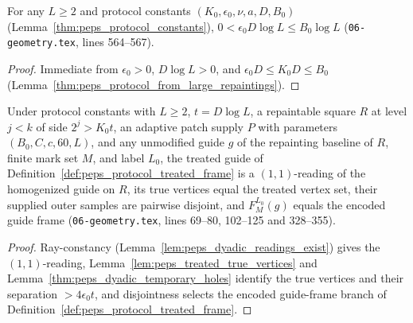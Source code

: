 \begin{lemma}
    \label{thm:peps_treated_radius_bounds}
    \leanok
    For any $L\ge2$ and protocol constants $(K_0,\epsilon_0,\nu,a,D,B_0)$ (Lemma~\ref{thm:peps_protocol_constants}), $0<\epsilon_0D\log L\le B_0\log L$ (\texttt{06-geometry.tex}, lines 564--567).
\end{lemma}

\begin{proof}\leanok
    Immediate from $\epsilon_0>0$, $D\log L>0$, and $\epsilon_0D\le K_0D\le B_0$ (Lemma~\ref{thm:peps_protocol_from_large_repaintings}).
\end{proof}

\begin{lemma}
    \label{thm:peps_treated_frame_spec}
    \leanok
    Under protocol constants with $L\ge2$, $t=D\log L$, a repaintable square $R$ at level $j<k$ of side $2^j>K_0t$, an adaptive patch supply $P$ with parameters $(B_0,C,c,60,L)$, and any unmodified guide $g$ of the repainting baseline of $R$, finite mark set $M$, and label $L_0$, the treated guide of Definition~\ref{def:peps_protocol_treated_frame} is a $(1,1)$-reading of the homogenized guide on $R$, its true vertices equal the treated vertex set, their supplied outer samples are pairwise disjoint, and $F_M^{L_0}(g)$ equals the encoded guide frame (\texttt{06-geometry.tex}, lines 69--80, 102--125 and 328--355).
\end{lemma}

\begin{proof}\leanok
    Ray-constancy (Lemma~\ref{lem:peps_dyadic_readings_exist}) gives the $(1,1)$-reading, Lemma~\ref{lem:peps_treated_true_vertices} and Lemma~\ref{thm:peps_dyadic_temporary_holes} identify the true vertices and their separation $>4\epsilon_0t$, and disjointness selects the encoded guide-frame branch of Definition~\ref{def:peps_protocol_treated_frame}.
\end{proof}

